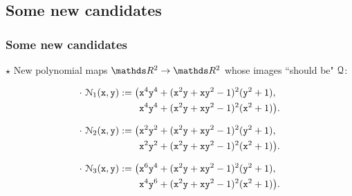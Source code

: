 \documentclass{beamer}
\begin{document}
\subsection{Some new candidates}
\begin{frame}
\frametitle{Some new candidates}
$\star$ New polynomial maps $\R^2\to\R^2$ whose images ``should be" $\mathcal{Q}$:

\begin{align*}
\cdot\ \mathcal{N}_1(\x,\y):=\big(&\x^4\y^4+(\x^2\y+\x\y^2-1)^2(\y^2+1),\\
&\x^4\y^4+(\x^2\y+\x\y^2-1)^2(\x^2+1)\big).
\end{align*}

\begin{align*}
\cdot\ \mathcal{N}_2(\x,\y):=\big(&\x^2\y^2+(\x^2\y+\x\y^2-1)^2(\y^2+1),\\
&\x^2\y^2+(\x^2\y+\x\y^2-1)^2(\x^2+1)\big).
\end{align*}

\begin{align*}
\cdot\ \mathcal{N}_3(\x,\y):=\big(&\x^6\y^4+(\x^2\y+\x\y^2-1)^2(\y^2+1),\\
&\x^4\y^6+(\x^2\y+\x\y^2-1)^2(\x^2+1)\big).
\end{align*}

\end{frame}
\end{document}
